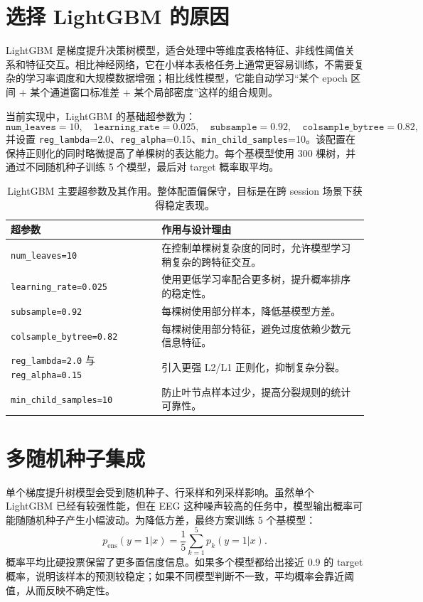 \section{选择 LightGBM 的原因}

LightGBM 是梯度提升决策树模型，适合处理中等维度表格特征、非线性阈值关系和特征交互。相比神经网络，它在小样本表格任务上通常更容易训练，不需要复杂的学习率调度和大规模数据增强；相比线性模型，它能自动学习“某个 epoch 区间 + 某个通道窗口标准差 + 某个局部密度”这样的组合规则。

当前实现中，LightGBM 的基础超参数为：
\[
\texttt{num\_leaves}=10,\quad
\texttt{learning\_rate}=0.025,\quad
\texttt{subsample}=0.92,\quad
\texttt{colsample\_bytree}=0.82,
\]
并设置 \texttt{reg\_lambda}=2.0、\texttt{reg\_alpha}=0.15、\texttt{min\_child\_samples}=10。该配置在保持正则化的同时略微提高了单棵树的表达能力。每个基模型使用 300 棵树，并通过不同随机种子训练 5 个模型，最后对 target 概率取平均。

\begin{table}[htbp]
\centering
\small
\begin{tabular}{lp{8.2cm}}
\hline
超参数 & 作用与设计理由 \\
\hline
\texttt{num\_leaves=10} & 在控制单棵树复杂度的同时，允许模型学习稍复杂的跨特征交互。 \\
\texttt{learning\_rate=0.025} & 使用更低学习率配合更多树，提升概率排序的稳定性。 \\
\texttt{subsample=0.92} & 每棵树使用部分样本，降低基模型方差。 \\
\texttt{colsample\_bytree=0.82} & 每棵树使用部分特征，避免过度依赖少数元信息特征。 \\
\texttt{reg\_lambda=2.0} 与 \texttt{reg\_alpha=0.15} & 引入更强 L2/L1 正则化，抑制复杂分裂。 \\
\texttt{min\_child\_samples=10} & 防止叶节点样本过少，提高分裂规则的统计可靠性。 \\
\hline
\end{tabular}
\caption{LightGBM 主要超参数及其作用。整体配置偏保守，目标是在跨 session 场景下获得稳定表现。}
\end{table}

\section{多随机种子集成}

单个梯度提升树模型会受到随机种子、行采样和列采样影响。虽然单个 LightGBM 已经有较强性能，但在 EEG 这种噪声较高的任务中，模型输出概率可能随随机种子产生小幅波动。为降低方差，最终方案训练 5 个基模型：
\[
p_{\mathrm{ens}}(y=1|x)=\frac{1}{5}\sum_{k=1}^{5}p_k(y=1|x).
\]
概率平均比硬投票保留了更多置信度信息。如果多个模型都给出接近 0.9 的 target 概率，说明该样本的预测较稳定；如果不同模型判断不一致，平均概率会靠近阈值，从而反映不确定性。

